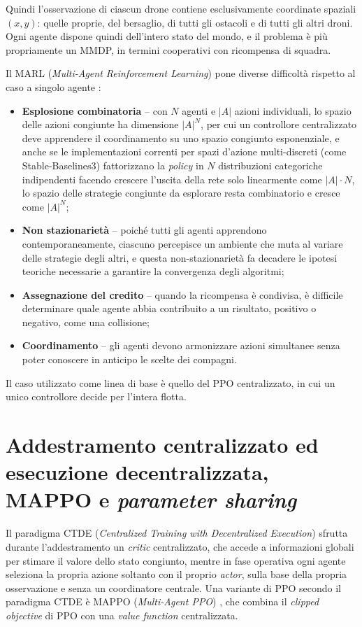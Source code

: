 \documentclass[12pt,a4paper,twoside]{report}
\newcommand{\parencite}[1]{\citep{#1}}
\begin{document}
Quindi l'osservazione di ciascun drone contiene esclusivamente coordinate spaziali $(x, y)$: quelle proprie, del bersaglio, di tutti gli ostacoli e di tutti gli altri droni. Ogni agente dispone quindi dell'intero stato del mondo, e il problema è più propriamente un MMDP, in termini cooperativi con ricompensa di squadra.

Il MARL (\emph{Multi-Agent Reinforcement Learning}) pone diverse difficoltà rispetto al caso a singolo agente \parencite{zhang2021}:
\begin{itemize}
    \item \textbf{Esplosione combinatoria} -- con $N$ agenti e $|A|$ azioni individuali, lo spazio delle azioni congiunte ha dimensione $|A|^N$, per cui un controllore centralizzato deve apprendere il coordinamento su uno spazio congiunto esponenziale, e anche se le implementazioni correnti per spazi d'azione multi-discreti (come Stable-Baselines3) fattorizzano la \emph{policy} in $N$ distribuzioni categoriche indipendenti facendo crescere l'uscita della rete solo linearmente come $|A| \cdot N$, lo spazio delle strategie congiunte da esplorare resta combinatorio e cresce come $|A|^N$;
    \item \textbf{Non stazionarietà} -- poiché tutti gli agenti apprendono contemporaneamente, ciascuno percepisce un ambiente che muta al variare delle strategie degli altri, e questa non-stazionarietà fa decadere le ipotesi teoriche necessarie a garantire la convergenza degli algoritmi;
    \item \textbf{Assegnazione del credito} -- quando la ricompensa è condivisa, è difficile determinare quale agente abbia contribuito a un risultato, positivo o negativo, come una collisione;
    \item \textbf{Coordinamento} -- gli agenti devono armonizzare azioni simultanee senza poter conoscere in anticipo le scelte dei compagni.
\end{itemize}
Il caso utilizzato come linea di base è quello del PPO centralizzato, in cui un unico controllore decide per l'intera flotta.
\newpage
\section{Addestramento centralizzato ed esecuzione decentralizzata, MAPPO e \emph{parameter sharing}}
\label{sec:ctde_mappo}

Il paradigma CTDE (\emph{Centralized Training with Decentralized Execution}) sfrutta durante l'addestramento un \emph{critic} centralizzato, che accede a informazioni globali per stimare il valore dello stato congiunto, mentre in fase operativa ogni agente seleziona la propria azione soltanto con il proprio \emph{actor}, sulla base della propria osservazione e senza un coordinatore centrale. Una variante di PPO secondo il paradigma CTDE è MAPPO (\emph{Multi-Agent PPO}) \parencite{yu2022}, che combina il \emph{clipped objective} di PPO con una \emph{value function} centralizzata.
\end{document}
